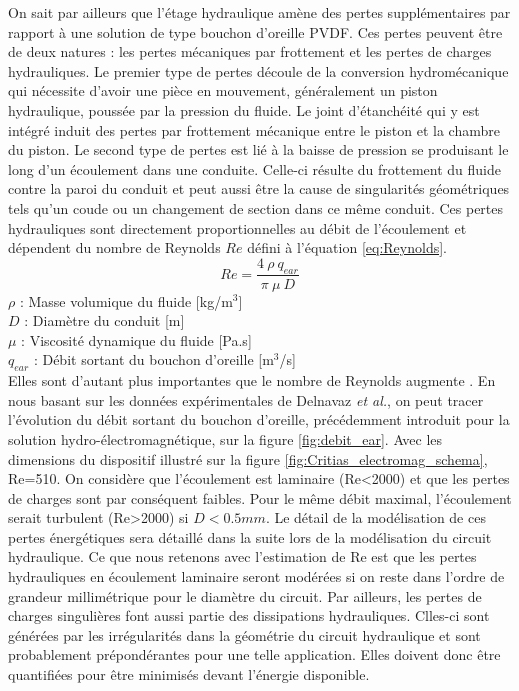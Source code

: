 On sait par ailleurs que l'étage hydraulique amène des pertes supplémentaires par rapport à une solution de type bouchon d'oreille PVDF. Ces pertes peuvent être de deux natures : les pertes mécaniques par frottement et les pertes de charges hydrauliques. Le premier type de pertes découle de la conversion hydromécanique qui nécessite d'avoir une pièce en mouvement, généralement un piston hydraulique, poussée par la pression du fluide. Le joint d'étanchéité qui y est intégré induit des pertes par frottement mécanique entre le piston et la chambre du piston. Le second type de pertes est lié à la baisse de pression se produisant le long d'un écoulement dans une conduite. Celle-ci résulte du frottement du fluide contre la paroi du conduit et peut aussi être la cause de singularités géométriques tels qu'un coude ou un changement de section dans ce même conduit. Ces pertes hydrauliques sont directement proportionnelles au débit de l'écoulement et dépendent du nombre de Reynolds $Re$ défini à l'équation \ref{eq:Reynolds}.
\begin{equation}
	Re = \dfrac{4\ \rho\ q_{ear}}{\pi\ \mu\ D}
\label{eq:Reynolds}
\end{equation}
$\rho$ : Masse volumique du fluide [kg/m$^3$]\\
$D$ :   Diamètre du conduit [m] \\
$\mu$ :  Viscosité dynamique du fluide [Pa.s] \\
$q_{ear}$ : Débit sortant du bouchon d'oreille [m$^3$/s]\\

Elles sont d'autant plus importantes que le nombre de Reynolds augmente \cite{Fady1988}. En nous basant sur les données expérimentales de Delnavaz \emph{et al.}, on peut tracer l'évolution du débit sortant du bouchon d'oreille, précédemment introduit pour la solution hydro-électromagnétique, sur la figure \ref{fig:debit_ear}. Avec les dimensions du dispositif illustré sur la figure \ref{fig:Critias_electromag_schema}, Re=510. On considère que l'écoulement est laminaire (Re<2000) et que les pertes de charges sont par conséquent faibles. Pour le même débit maximal, l'écoulement serait turbulent (Re>2000) si $D<0.5mm$. Le détail de la modélisation de ces pertes énergétiques sera détaillé dans la suite lors de la modélisation du circuit hydraulique. Ce que nous retenons avec l'estimation de Re est que les pertes hydrauliques en écoulement laminaire seront modérées si on reste dans l'ordre de grandeur millimétrique pour le diamètre du circuit. Par ailleurs, les pertes de charges singulières font aussi partie des dissipations hydrauliques. Clles-ci sont générées par les irrégularités dans la géométrie du circuit hydraulique et sont probablement prépondérantes pour une telle application. Elles doivent donc être quantifiées pour être minimisés devant l'énergie disponible.
